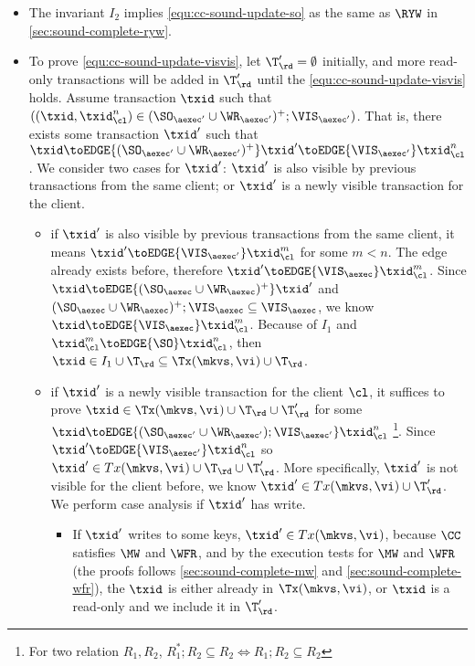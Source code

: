 \begin{itemize}
\item The invariant \( I_2 \) implies \cref{equ:cc-sound-update-so} as the same as \( \RYW \) in \cref{sec:sound-complete-ryw}.
\item To prove \cref{equ:cc-sound-update-visvis}, let \( \T'_\rd = \emptyset \) initially,
and more read-only transactions will be added in \( \T'_\rd \) until the \cref{equ:cc-sound-update-visvis} holds.
Assume transaction \( \txid \) such that \( ((\txid, \txid_\cl^n) \in ( \SO_{\aexec'} \cup \WR_{\aexec'} )^{+} ; \VIS_{\aexec'}) \).
That is, there exists some transaction \( \txid' \) such that
\( \txid \toEDGE{( \SO_{\aexec'} \cup \WR_{\aexec'} )^+}  \txid' \toEDGE{\VIS_{\aexec'}} \txid_\cl^n\).
We consider two cases for \( \txid' \): \( \txid' \) is also visible by previous transactions from the same client; 
or \( \txid' \) is a newly visible transaction for the client.
\begin{itemize}
    \item if \( \txid' \) is also visible by previous transactions from the same client, it means \( \txid' \toEDGE{\VIS_{\aexec'}} \txid_\cl^m \) for some \( m < n \).
    The edge already exists before, therefore \( \txid' \toEDGE{\VIS_\aexec} \txid_\cl^m \).
    Since \( \txid \toEDGE{( \SO_{\aexec} \cup \WR_{\aexec} )^{+}} \txid' \) and \( ( \SO_{\aexec} \cup \WR_{\aexec} )^{+} ; \VIS_{\aexec} \subseteq \VIS_{\aexec} \),
    we know \( \txid \toEDGE{ \VIS_{\aexec} }  \txid_\cl^m  \).
    Because of \( I_1 \) and \( \txid_\cl^m \toEDGE{\SO} \txid_\cl^n \), then \( \txid \in I_1 \cup \T_\rd \subseteq \Tx(\mkvs, \vi) \cup \T_\rd \).
    
    \item if \( \txid' \) is a newly visible transaction for the client \( \cl \),
    it suffices to prove \(\txid \in \Tx(\mkvs, \vi) \cup \T_\rd \cup \T'_\rd \) 
    for some \( \txid \toEDGE{ ( \SO_{\aexec'} \cup \WR_{\aexec'} ) ; \VIS_{\aexec'} } \txid_\cl^n  \)%
    \footnote{For two relation \( R_1, R_2\), \( R_1^* ; R_2 \subseteq R_2 \iff R_1 ; R_2 \subseteq R_2 \) }.
    Since \( \txid' \toEDGE{\VIS_{\aexec'}} \txid_\cl^n \) so \( \txid' \in Tx(\mkvs, \vi) \cup \T_\rd \cup \T'_\rd\).
    More specifically, \( \txid' \) is not visible for the client before, we know \( \txid' \in Tx(\mkvs, \vi) \cup \T'_\rd\).
    We perform case analysis if \( \txid' \) has write.
    \begin{itemize}

        \item If \( \txid' \) writes to some keys, \ie \( \txid' \in Tx(\mkvs, \vi) \), 
        because  \( \CC \) satisfies \( \MW \) and \( \WFR \),
        and by the execution tests for \( \MW \) and \( \WFR \) (the proofs follows \cref{sec:sound-complete-mw} and \cref{sec:sound-complete-wfr}),
        the \( \txid \) is either already in \( \Tx(\mkvs, \vi) \), 
        or \( \txid \) is a read-only and we include it in \( \T'_\rd \).


\end{itemize}
\end{itemize}
\end{itemize}
